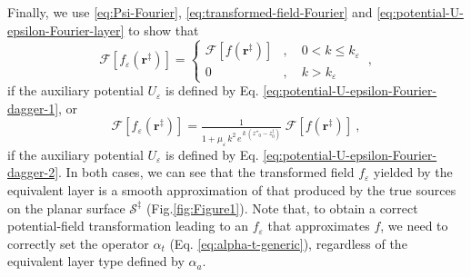 Finally, we use \ref{eq:Psi-Fourier}, \ref{eq:transformed-field-Fourier} and \ref{eq:potential-U-epsilon-Fourier-layer} to show that
\begin{equation}
	\mathcal{F} [ f_{\varepsilon}(\mathbf{r}^{\ddagger}) ] = 
	\begin{cases}
		\mathcal{F} [ f(\mathbf{r}^{\ddagger}) ] &
		, \quad 0 < k \le k_{\varepsilon} \\
		0 & , \quad k > k_{\varepsilon} 
	\end{cases} \: ,
	\label{eq:transformed-field-continuous-layer-1-Fourier}
\end{equation}
if the auxiliary potential $U_{\varepsilon}$ is defined by Eq. \ref{eq:potential-U-epsilon-Fourier-dagger-1},
or
\begin{equation}
	\mathcal{F} [ f_{\varepsilon}(\mathbf{r}^{\ddagger}) ] = 
	\tfrac{1}{1 + \mu_{\varepsilon} \, k^{2} \, e^{\, k \, (z''_{0} - z^{\ddagger}_{0})}} \; 
	\mathcal{F} [ f(\mathbf{r}^{\ddagger}) ] \: ,
	\label{eq:transformed-field-continuous-layer-2-Fourier}
\end{equation}
if the auxiliary potential $U_{\varepsilon}$ is defined by Eq. \ref{eq:potential-U-epsilon-Fourier-dagger-2}.
In both cases, we can see that the transformed field $f_{\varepsilon}$ yielded by the equivalent layer 
is a smooth approximation of that produced by the true sources on the planar surface $\mathcal{S}^{\ddagger}$
(Fig.\ref{fig:Figure1}). Note that, to obtain a correct potential-field transformation leading to an $f_{\varepsilon}$ 
that approximates $f$, we need to correctly set the operator $\alpha_{t}$ (Eq. \ref{eq:alpha-t-generic}), 
regardless of the equivalent layer type defined by $\alpha_{a}$.


